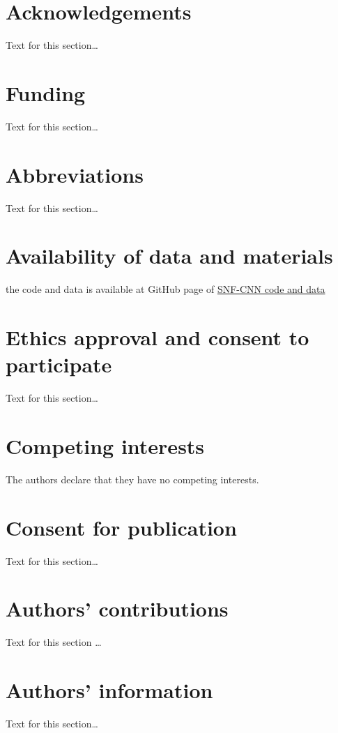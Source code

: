 \documentclass{bmcart}
\begin{document}
\begin{backmatter}

\section*{Acknowledgements}%
Text for this section\ldots

\section*{Funding}%
Text for this section\ldots

\section*{Abbreviations}%
Text for this section\ldots

\section*{Availability of data and materials}%
the code and data is available at GitHub page of \href{https://github.com/aminkhod/DDI-Project/tree/master/CNN\%20model\%20to\%20Recommend\%20Comperhancive\%20DDIs}{SNF-CNN code and data}


\section*{Ethics approval and consent to participate}%
Text for this section\ldots

\section*{Competing interests}
The authors declare that they have no competing interests.

\section*{Consent for publication}%
Text for this section\ldots

\section*{Authors' contributions}
Text for this section \ldots

\section*{Authors' information}%
Text for this section\ldots


\end{backmatter}
\end{document}
